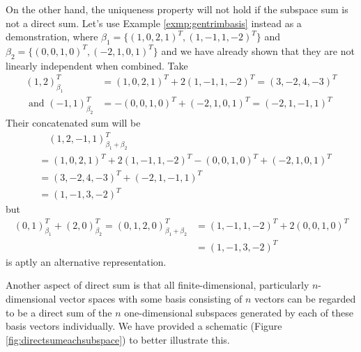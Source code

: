 On the other hand, the uniqueness property will not hold if the subspace sum is not a direct sum. Let's use Example \ref{exmp:gentrimbasis} instead as a demonstration, where $\mathcal{\beta}_1 = \{(1,0,2,1)^T, (1,-1,1,-2)^T\}$ and $\mathcal{\beta}_2 = \{(0,0,1,0)^T, (-2,1,0,1)^T\}$ and we have already shown that they are not linearly independent when combined. Take
\begin{align*}
(1,2)_{\beta_1}^T &= (1,0,2,1)^T + 2(1,-1,1,-2)^T = (3,-2,4,-3)^T \\
\text{ and } (-1,1)_{\beta_2}^T &= -(0,0,1,0)^T + (-2,1,0,1)^T = (-2,1,-1,1)^T
\end{align*} Their concatenated sum will be 
\begin{align*}
&\quad (1,2,-1,1)_{\beta_1+\beta_2}^T \\ 
&= (1,0,2,1)^T + 2(1,-1,1,-2)^T - (0,0,1,0)^T + (-2,1,0,1)^T \\
&= (3,-2,4,-3)^T + (-2,1,-1,1)^T \\
&= (1,-1,3,-2)^T  
\end{align*}
but 
\begin{align*}
(0,1)_{\beta_1}^T + (2,0)_{\beta_2}^T = (0,1,2,0)_{\beta_1+\beta_2}^T &= (1,-1,1,-2)^T + 2(0,0,1,0)^T \\
&= (1,-1,3,-2)^T
\end{align*}
is aptly an alternative representation.

Another aspect of direct sum is that all finite-dimensional, particularly $n$-dimensional vector spaces with some basis consisting of $n$ vectors can be regarded to be a direct sum of the $n$ one-dimensional subspaces generated by each of these basis vectors individually. We have provided a schematic (Figure \ref{fig:directsumeachsubspace}) to better illustrate this.

